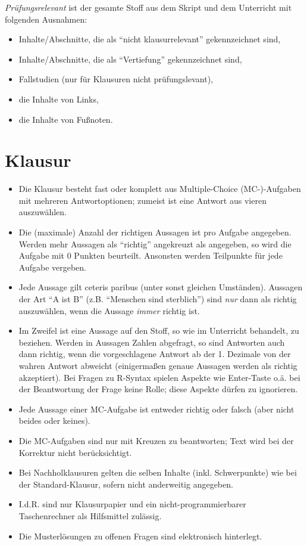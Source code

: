 \documentclass[12pt,ngerman,]{book}
\providecommand{\tightlist}{%
  \setlength{\itemsep}{0pt}\setlength{\parskip}{0pt}}
\begin{document}
\emph{Prüfungsrelevant} ist der gesamte Stoff aus dem Skript und dem
Unterricht mit folgenden Ausnahmen:

\begin{itemize}
\tightlist
\item
  Inhalte/Abschnitte, die als ``nicht klausurrelevant'' gekennzeichnet
  sind,
\item
  Inhalte/Abschnitte, die als ``Vertiefung'' gekennzeichnet sind,
\item
  Fallstudien (nur für Klausuren nicht prüfungslevant),
\item
  die Inhalte von Links,
\item
  die Inhalte von Fußnoten.
\end{itemize}

\section{Klausur}\label{klausur-1}

\begin{itemize}
\item
  Die Klausur besteht fast oder komplett aus Multiple-Choice
  (MC-)-Aufgaben mit mehreren Antwortoptionen; zumeist ist eine Antwort
  aus vieren auszuwählen.
\item
  Die (maximale) Anzahl der richtigen Aussagen ist pro Aufgabe
  angegeben. Werden mehr Aussagen als ``richtig'' angekreuzt als
  angegeben, so wird die Aufgabe mit 0 Punkten beurteilt. Ansonsten
  werden Teilpunkte für jede Aufgabe vergeben.
\item
  Jede Aussage gilt ceteris paribus (unter sonst gleichen Umständen).
  Aussagen der Art ``A ist B'' (z.B. ``Menschen sind sterblich'') sind
  \emph{nur} dann als richtig auszuwählen, wenn die Aussage \emph{immer}
  richtig ist.
\item
  Im Zweifel ist eine Aussage auf den Stoff, so wie im Unterricht
  behandelt, zu beziehen. Werden in Aussagen Zahlen abgefragt, so sind
  Antworten auch dann richtig, wenn die vorgeschlagene Antwort ab der 1.
  Dezimale von der wahren Antwort abweicht (einigermaßen genaue Aussagen
  werden als richtig akzeptiert). Bei Fragen zu R-Syntax spielen Aspekte
  wie Enter-Taste o.ä. bei der Beantwortung der Frage keine Rolle; diese
  Aspekte dürfen zu ignorieren.
\item
  Jede Aussage einer MC-Aufgabe ist entweder richtig oder falsch (aber
  nicht beides oder keines).
\item
  Die MC-Aufgaben sind nur mit Kreuzen zu beantworten; Text wird bei der
  Korrektur nicht berücksichtigt.
\item
  Bei Nachholklausuren gelten die selben Inhalte (inkl. Schwerpunkte)
  wie bei der Standard-Klausur, sofern nicht anderweitig angegeben.
\item
  I.d.R. sind nur Klausurpapier und ein nicht-programmierbarer
  Taschenrechner als Hilfsmittel zulässig.
\item
  Die Musterlösungen zu offenen Fragen sind elektronisch hinterlegt.
\end{itemize}
\end{document}
